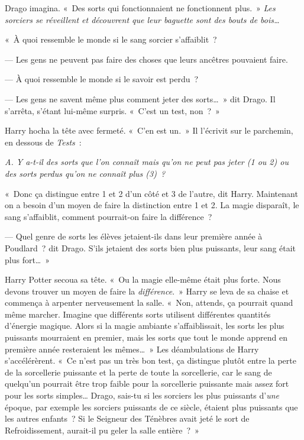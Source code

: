 Drago imagina. «~Des sorts qui fonctionnaient ne fonctionnent plus.~» \emph{Les sorciers se réveillent et découvrent que leur baguette sont des bouts de bois…}

«~À quoi ressemble le monde si le sang sorcier s'affaiblit~?

--- Les gens ne peuvent pas faire des choses que leurs ancêtres pouvaient faire.

--- À quoi ressemble le monde si le savoir est perdu~?

--- Les gens ne savent même plus comment jeter des sorts…~» dit Drago. Il s'arrêta, s'étant lui-même surpris. «~C'est un test, non~?~»

Harry hocha la tête avec fermeté. «~C'en est un.~» Il l'écrivit sur le parchemin, en dessous de \emph{Tests}~:

\emph{A. Y a-t-il des sorts que l'on connaît mais qu'on ne peut pas jeter (1 ou 2) ou des sorts perdus qu'on ne connaît plus (3)~?}

«~Donc ça distingue entre 1 et 2 d'un côté et 3 de l'autre, dit Harry. Maintenant on a besoin d'un moyen de faire la distinction entre 1 et 2. La magie disparaît, le sang s'affaiblit, comment pourrait-on faire la différence~?

--- Quel genre de sorts les élèves jetaient-ils dans leur première année à Poudlard~? dit Drago. S'ils jetaient des sorts bien plus puissants, leur sang était plus fort…~»

Harry Potter secoua sa tête. «~Ou la magie elle-même était plus forte. Nous devons trouver un moyen de faire la \emph{différence}.~» Harry se leva de sa chaise et commença à arpenter nerveusement la salle. «~Non, attends, ça pourrait quand même marcher. Imagine que différents sorts utilisent différentes quantités d'énergie magique. Alors si la magie ambiante s'affaiblissait, les sorts les plus puissants mourraient en premier, mais les sorts que tout le monde apprend en première année resteraient les mêmes…~» Les déambulations de Harry s'accélérèrent. «~Ce n'est pas un très bon test, ça distingue plutôt entre la perte de la sorcellerie puissante et la perte de toute la sorcellerie, car le sang de quelqu'un pourrait être trop faible pour la sorcellerie puissante mais assez fort pour les sorts simples… Drago, sais-tu si les sorciers les plus puissants d'\emph{une} époque, par exemple les sorciers puissants de ce siècle, étaient plus puissants que les autres enfants~? Si le Seigneur des Ténèbres avait jeté le sort de Refroidissement, aurait-il pu geler la salle entière~?~»

